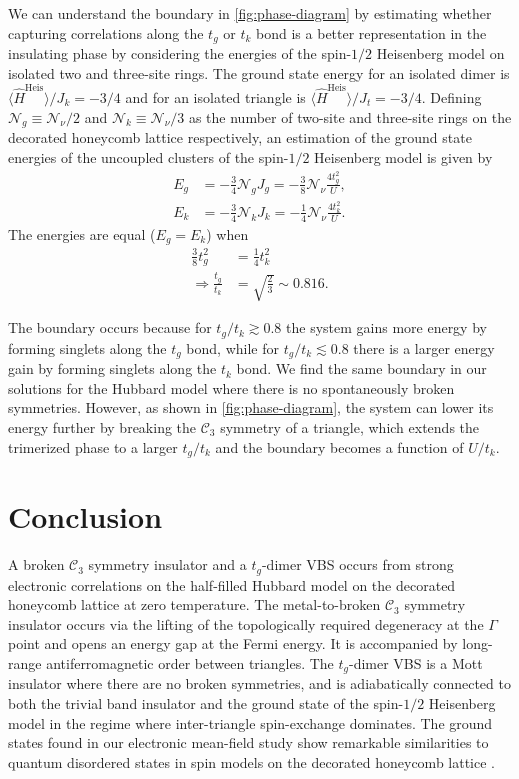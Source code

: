\documentclass[reprint,aps,prb,amsmath,amssymb]{revtex4-2}
\begin{document}
We can understand the boundary in \cref{fig:phase-diagram} by estimating whether capturing correlations along the $t_g$ or $t_k$ bond is a better representation in the insulating phase by considering the energies of the spin-$1/2$ Heisenberg model on isolated two and three-site rings. The ground state energy for an isolated dimer is $\langle \hat{H}^{\textrm{Heis}} \rangle / J_k = -3/4$ and for an isolated triangle is $\langle \hat{H}^{\textrm{Heis}} \rangle / J_t = -3/4$. Defining $\mathcal{N}_g \equiv \mathcal{N}_{\nu} / 2$ and $\mathcal{N}_k \equiv \mathcal{N}_{\nu} / 3$ as the number of two-site and three-site rings on the decorated honeycomb lattice respectively, an estimation of the ground state energies of the uncoupled clusters of the spin-$1/2$ Heisenberg model is given by
%
\begin{align}
	E_g & = - \frac{3}{4} \mathcal{N}_g J_g = - \frac{3}{8} \mathcal{N}_{\nu} \frac{4t_g^2}{U}, \nonumber \\
	E_k & = - \frac{3}{4} \mathcal{N}_k J_k = - \frac{1}{4} \mathcal{N}_{\nu} \frac{4t_k^2}{U}.
\end{align}
%
The energies are equal ($E_g = E_k$) when
%
\begin{align}
	\frac{3}{8} t_g^2 & = \frac{1}{4} t_k^2 \nonumber \\
	\Rightarrow \frac{t_g}{t_k} & = \sqrt{\frac{2}{3}} \sim 0.816.
\end{align}

The boundary occurs because for $t_g/t_k \gtrsim 0.8$ the system gains more energy by forming singlets along the $t_g$ bond, while for $t_g/t_k \lesssim 0.8$ there is a larger energy gain by forming singlets along the $t_k$ bond. We find the same boundary in our solutions for the Hubbard model where there is no spontaneously broken symmetries. However, as shown in \cref{fig:phase-diagram}, the system can lower its energy further by breaking the $\mathcal{C}_3$ symmetry of a triangle, which extends the trimerized phase to a larger $t_g/t_k$ and the boundary becomes a function of $U/t_k$.

\section{Conclusion} \label{sec:conclusion}

A broken $\mathcal{C}_3$ symmetry insulator and a $t_g$-dimer VBS occurs from strong electronic correlations on the half-filled Hubbard model on the decorated honeycomb lattice at zero temperature.
%
The metal-to-broken $\mathcal{C}_3$ symmetry insulator occurs via the lifting of the topologically required degeneracy at the $\Gamma$ point and opens an energy gap at the Fermi energy. It is accompanied by long-range antiferromagnetic order between triangles.
%
The $t_g$-dimer VBS is a Mott insulator where there are no broken symmetries, and is adiabatically connected to both the trivial band insulator and the ground state of the spin-$1/2$ Heisenberg model in the regime where inter-triangle spin-exchange dominates. The ground states found in our electronic mean-field study show remarkable similarities to quantum disordered states in spin models on the decorated honeycomb lattice \cite{Richter2004,Misguich2007,Yang2010,Jahromi2018}. 
\end{document}
